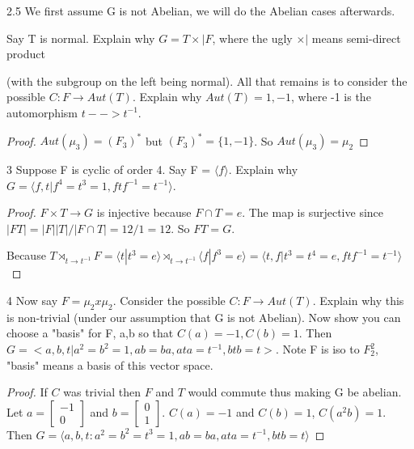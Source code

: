 \documentclass{article}
\begin{document}
\begin{PROB}{2.5}\label{Problem 2.5.}
    We first assume G is not Abelian, we will do the Abelian cases afterwards. 
    
    Say T is normal.  Explain why $G = T \times| F$, where the ugly $\times|$ means semi-direct product

(with the subgroup on the left being normal).  All that remains is to consider the possible $C: F \to Aut(T)$. Explain why $Aut(T) = {1,-1}$, where -1 is the automorphism $t --> t^{-1}$. 

\end{PROB}
\begin{proof}
    $Aut(\mu_3) = (F_3)^*$ but $(F_3)^* = \{1, -1\}$. So $Aut(\mu_3) = \mu_2$
\end{proof}


\bigskip

\begin{PROB}{3}\label{Problem 3.}
    Suppose F is cyclic of order 4. Say F = $\langle f \rangle$. Explain why  $G = \langle f,t| f^4 = t^3 =1, ftf^{-1} = t^{-1} \rangle$. 
\end{PROB}
\begin{proof}
    $F \times T \to G$ is injective because $F \cap T = e$. The map is surjective since $|FT| = |F||T|/|F \cap T| = 12/1 = 12$. So $FT = G$.

    Because $T \rtimes_{t \to t^{-1}} F = \langle t | t^3=e \rangle \rtimes_{t \to t^{-1}} \langle f | f^3=e \rangle = \langle t, f | t^3=t^4 = e, ftf^{-1} = t^{-1} \rangle$
\end{proof}

\bigskip

\begin{PROB}{4}\label{Problem 4.}
    Now say $F = \mu_2 x \mu_2$. Consider the possible $C: F \to Aut(T)$. Explain why this is non-trivial (under our assumption that G is not Abelian). Now show you can choose a "basis" for F, a,b so that $C(a) = -1, C(b) =1$. Then $G = <a,b,t| a^2 = b^2 = 1, ab = ba, a t a = t^{-1}, b t b = t>$. Note F is iso to $F_2^2$, "basis"  means a basis of this vector space.
\end{PROB}
\begin{proof}
    If $C$ was trivial then $F$ and $T$ would commute thus making G be abelian. Let $a = \begin{bmatrix}
        -1 \\ 0
    \end{bmatrix}$ and $b = \begin{bmatrix}
        0 \\ 1
    \end{bmatrix}$. $C(a) =-1$ and $C(b) = 1$, $C(a^2b) =1$. Then $G = \langle a, b, t : a^2 = b^2 = t^3 = 1, ab = ba, ata = t^{-1}, btb = t \rangle$
\end{proof}
\end{document}
